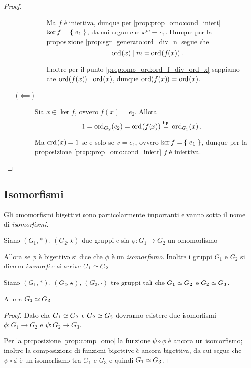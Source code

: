 \begin{proof}
\begin{enumerate}[label={(\roman*)}]
\begin{description}
\begin{itemize}
                Ma $f$ è iniettiva, dunque per \ref{prop:prop_omo:cond_iniett} $\ker f = \set{e_1}$, da cui segue che $x^m = e_1$. 
                Dunque per la proposizione \ref{prop:sgr_generato:ord_div_n} segue che \[
                    \ord x \divides m = \ord{f(x)}.    
                \]

                Inoltre per il punto \ref{prop:omo_ord:ord_f_div_ord_x} sappiamo che $\ord{f(x)} \divides \ord x$, dunque $\ord{f(x)} = \ord x$.
            \end{itemize} 
            \item[($\impliedby$)] Sia $x \in \ker f$, ovvero $f(x) = e_2$. Allora \[
                1 = \ord[G_2]{e_2} = \ord{f(x)} \stackrel{\text{hp.}}{=} \ord[G_1]{x}.
            \] 
            
            Ma $\ord x = 1$ se e solo se $x = e_1$, ovvero $\ker f = \set{e_1}$, dunque per la proposizione \ref{prop:prop_omo:cond_iniett} $f$ è iniettiva.
        \end{description}
    \end{enumerate}
\end{proof}

\subsection{Isomorfismi}

Gli omomorfismi bigettivi sono particolarmente importanti e vanno sotto il nome di \emph{isomorfismi}.

\begin{definition}
    [Isomorfismo] \label{def:isomorfismo}
    Siano $(G_1, *)$, $(G_2, \star)$ due gruppi e sia $\phi : G_1 \to G_2$ un omomorfismo.

    Allora se $\phi$ è bigettivo si dice che $\phi$ è un \emph{isomorfismo}. Inoltre i gruppi $G_1$ e $G_2$ si dicono \emph{isomorfi} e si scrive $G_1 \isomorph G_2$.
\end{definition}

\begin{corollary}\label{prop:trans_isomorf}
    Siano $(G_1, *)$, $(G_2, \star)$, $(G_3, \cdot)$ tre gruppi tali che $G_1 \isomorph G_2$ e $G_2 \isomorph G_3$.

    Allora $G_1 \isomorph G_3$.
\end{corollary}
\begin{proof}
    Dato che $G_1 \isomorph G_2$ e $G_2 \isomorph G_3$ dovranno esistere due isomorfismi $\phi : G_1 \to G_2$ e $\psi : G_2 \to G_3$.

    Per la proposizione \ref{prop:comp_omo} la funzione $\psi \circ \phi$ è ancora un isomorfismo; inoltre la composizione di funzioni bigettive è ancora bigettiva, da cui segue che $\psi \circ \phi$ è un isomorfismo tra $G_1$ e $G_3$ e quindi $G_1 \isomorph G_3$.
\end{proof}

